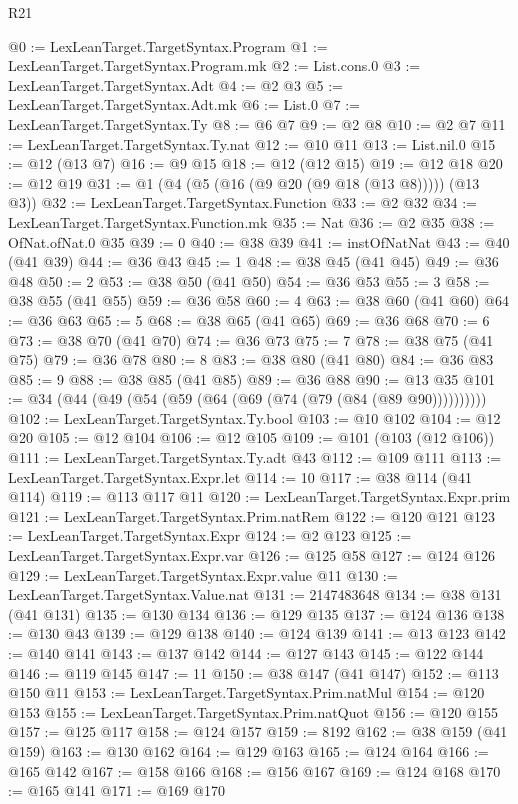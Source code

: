 \begin{lexlean}{R21}
\begin{coremodule}
@0 := LexLeanTarget.TargetSyntax.Program
@1 := LexLeanTarget.TargetSyntax.Program.mk
@2 := List.cons.{0}
@3 := LexLeanTarget.TargetSyntax.Adt
@4 := @2 @3
@5 := LexLeanTarget.TargetSyntax.Adt.mk
@6 := List.{0}
@7 := LexLeanTarget.TargetSyntax.Ty
@8 := @6 @7
@9 := @2 @8
@10 := @2 @7
@11 := LexLeanTarget.TargetSyntax.Ty.nat
@12 := @10 @11
@13 := List.nil.{0}
@15 := @12 (@13 @7)
@16 := @9 @15
@18 := @12 (@12 @15)
@19 := @12 @18
@20 := @12 @19
@31 := @1 (@4 (@5 (@16 (@9 @20 (@9 @18 (@13 @8))))) (@13 @3))
@32 := LexLeanTarget.TargetSyntax.Function
@33 := @2 @32
@34 := LexLeanTarget.TargetSyntax.Function.mk
@35 := Nat
@36 := @2 @35
@38 := OfNat.ofNat.{0} @35
@39 := 0
@40 := @38 @39
@41 := instOfNatNat
@43 := @40 (@41 @39)
@44 := @36 @43
@45 := 1
@48 := @38 @45 (@41 @45)
@49 := @36 @48
@50 := 2
@53 := @38 @50 (@41 @50)
@54 := @36 @53
@55 := 3
@58 := @38 @55 (@41 @55)
@59 := @36 @58
@60 := 4
@63 := @38 @60 (@41 @60)
@64 := @36 @63
@65 := 5
@68 := @38 @65 (@41 @65)
@69 := @36 @68
@70 := 6
@73 := @38 @70 (@41 @70)
@74 := @36 @73
@75 := 7
@78 := @38 @75 (@41 @75)
@79 := @36 @78
@80 := 8
@83 := @38 @80 (@41 @80)
@84 := @36 @83
@85 := 9
@88 := @38 @85 (@41 @85)
@89 := @36 @88
@90 := @13 @35
@101 := @34 (@44 (@49 (@54 (@59 (@64 (@69 (@74 (@79 (@84 (@89 @90))))))))))
@102 := LexLeanTarget.TargetSyntax.Ty.bool
@103 := @10 @102
@104 := @12 @20
@105 := @12 @104
@106 := @12 @105
@109 := @101 (@103 (@12 @106))
@111 := LexLeanTarget.TargetSyntax.Ty.adt @43
@112 := @109 @111
@113 := LexLeanTarget.TargetSyntax.Expr.let
@114 := 10
@117 := @38 @114 (@41 @114)
@119 := @113 @117 @11
@120 := LexLeanTarget.TargetSyntax.Expr.prim
@121 := LexLeanTarget.TargetSyntax.Prim.natRem
@122 := @120 @121
@123 := LexLeanTarget.TargetSyntax.Expr
@124 := @2 @123
@125 := LexLeanTarget.TargetSyntax.Expr.var
@126 := @125 @58
@127 := @124 @126
@129 := LexLeanTarget.TargetSyntax.Expr.value @11
@130 := LexLeanTarget.TargetSyntax.Value.nat
@131 := 2147483648
@134 := @38 @131 (@41 @131)
@135 := @130 @134
@136 := @129 @135
@137 := @124 @136
@138 := @130 @43
@139 := @129 @138
@140 := @124 @139
@141 := @13 @123
@142 := @140 @141
@143 := @137 @142
@144 := @127 @143
@145 := @122 @144
@146 := @119 @145
@147 := 11
@150 := @38 @147 (@41 @147)
@152 := @113 @150 @11
@153 := LexLeanTarget.TargetSyntax.Prim.natMul
@154 := @120 @153
@155 := LexLeanTarget.TargetSyntax.Prim.natQuot
@156 := @120 @155
@157 := @125 @117
@158 := @124 @157
@159 := 8192
@162 := @38 @159 (@41 @159)
@163 := @130 @162
@164 := @129 @163
@165 := @124 @164
@166 := @165 @142
@167 := @158 @166
@168 := @156 @167
@169 := @124 @168
@170 := @165 @141
@171 := @169 @170

\end{coremodule}
\end{lexlean}
